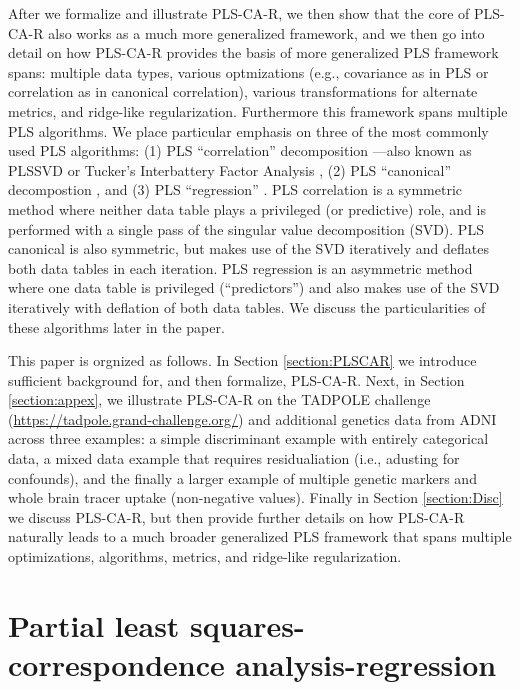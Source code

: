 \documentclass[12pt]{article}
\begin{document}
After we formalize and illustrate PLS-CA-R, we then show that the core
of PLS-CA-R also works as a much more generalized framework, and we then
go into detail on how PLS-CA-R provides the basis of more generalized
PLS framework spans: multiple data types, various optmizations (e.g.,
covariance as in PLS or correlation as in canonical correlation),
various transformations for alternate metrics, and ridge-like
regularization. Furthermore this framework spans multiple PLS
algorithms. We place particular emphasis on three of the most commonly
used PLS algorithms: (1) PLS ``correlation'' decomposition
\citep{krishnan_partial_2011, bookstein1994partial, mcintosh_spatial_1996}---also
known as PLSSVD \citep{tenenhaus_regression_1998} or Tucker's
Interbattery Factor Analysis \citep{tucker_inter-battery_1958}, (2) PLS
``canonical'' decompostion \citep{tenenhaus_regression_1998}, and (3)
PLS ``regression''
\citep{wold_soft_1975, wold_collinearity_1984, wold_pls-regression_2001}.
PLS correlation is a symmetric method where neither data table plays a
privileged (or predictive) role, and is performed with a single pass of
the singular value decomposition (SVD). PLS canonical is also symmetric,
but makes use of the SVD iteratively and deflates both data tables in
each iteration. PLS regression is an asymmetric method where one data
table is privileged (``predictors'') and also makes use of the SVD
iteratively with deflation of both data tables. We discuss the
particularities of these algorithms later in the paper.

This paper is orgnized as follows. In Section \ref{section:PLSCAR} we
introduce sufficient background for, and then formalize, PLS-CA-R. Next,
in Section \ref{section:appex}, we illustrate PLS-CA-R on the TADPOLE
challenge (\url{https://tadpole.grand-challenge.org/}) and additional
genetics data from ADNI across three examples: a simple discriminant
example with entirely categorical data, a mixed data example that
requires residualiation (i.e., adusting for confounds), and the finally
a larger example of multiple genetic markers and whole brain tracer
uptake (non-negative values). Finally in Section \ref{section:Disc} we
discuss PLS-CA-R, but then provide further details on how PLS-CA-R
naturally leads to a much broader generalized PLS framework that spans
multiple optimizations, algorithms, metrics, and ridge-like
regularization.

\hypertarget{partial-least-squares-correspondence-analysis-regression}{%
\section{Partial least squares-correspondence
analysis-regression}\label{partial-least-squares-correspondence-analysis-regression}}
\end{document}
